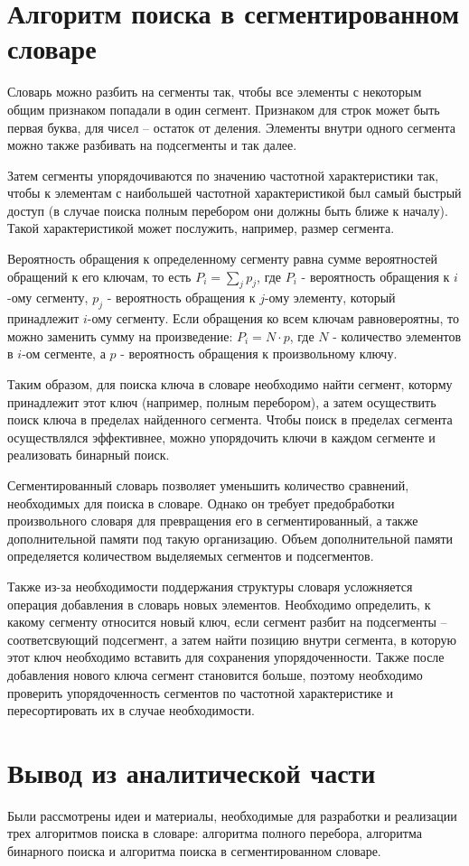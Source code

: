\section{Алгоритм поиска в сегментированном словаре}

Словарь можно разбить на сегменты так, чтобы все элементы с некоторым общим признаком попадали в один сегмент. Признаком для строк может быть первая буква, для чисел -- остаток от деления. Элементы внутри одного сегмента можно также разбивать на подсегменты и так далее.

Затем сегменты упорядочиваются по значению частотной характеристики так, чтобы к элементам с наибольшей частотной характеристикой был самый быстрый доступ (в случае поиска полным перебором они должны быть ближе к началу). Такой характеристикой может послужить, например, размер сегмента. 

Вероятность обращения к определенному сегменту равна сумме вероятностей обращений к его ключам, то есть $P_i = \sum_{j}p_j$, где $P_i$ - вероятность обращения к $i$-ому сегменту, $p_j$ - вероятность обращения к $j$-ому элементу, который принадлежит $i$-ому сегменту. Если обращения ко всем ключам равновероятны, то можно заменить сумму на произведение: $P_i = N \cdot p$, где $N$ - количество элементов в $i$-ом сегменте, а $p$ - вероятность обращения к произвольному ключу.

Таким образом, для поиска ключа в словаре необходимо найти сегмент, которму принадлежит этот ключ (например, полным перебором), а затем осуществить поиск ключа в пределах найденного сегмента. Чтобы поиск в пределах сегмента осуществлялся эффективнее, можно упорядочить ключи в каждом сегменте и реализовать бинарный поиск. 

Сегментированный словарь позволяет уменьшить количество сравнений, необходимых для поиска в словаре. Однако он требует предобработки произвольного словаря для превращения его в сегментированный, а также дополнительной памяти под такую организацию. Объем дополнительной памяти определяется количеством выделяемых сегментов и подсегментов.

Также из-за необходимости поддержания структуры словаря усложняется операция добавления в словарь новых элементов. Необходимо определить, к какому сегменту относится новый ключ, если сегмент разбит на подсегменты -- соответсвующий подсегмент, а затем найти позицию внутри сегмента, в которую этот ключ необходимо вставить для сохранения упорядоченности. Также после добавления нового ключа сегмент становится больше, поэтому необходимо проверить упорядоченность сегментов по частотной характеристике и пересортировать их в случае необходимости. 

\section{Вывод из аналитической части}
Были рассмотрены идеи и материалы, необходимые для  разработки и реализации трех алгоритмов поиска в словаре: алгоритма полного перебора, алгоритма бинарного поиска и алгоритма поиска в сегментированном словаре. 

